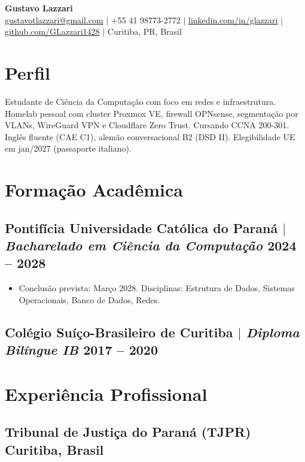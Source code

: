 \documentclass[10.5pt]{article}
\begin{document}
\begin{center}
    {\LARGE\bfseries Gustavo Lazzari} \\
    \vspace{2pt}
    \href{mailto:gustavotlazzari@gmail.com}{gustavotlazzari@gmail.com} $|$
    +55 41 98773-2772 $|$
    \href{https://www.linkedin.com/in/glazzari}{linkedin.com/in/glazzari} $|$
    \href{https://github.com/GLazzari1428}{github.com/GLazzari1428} $|$
    Curitiba, PR, Brasil
\end{center}

\section{Perfil}
Estudante de Ci\^{e}ncia da Computa\c{c}\~{a}o com foco em redes e infraestrutura. Homelab pessoal com
cluster Proxmox VE, firewall OPNsense, segmenta\c{c}\~{a}o por VLANs, WireGuard VPN e Cloudflare Zero Trust.
Cursando CCNA 200-301. Ingl\^{e}s fluente (CAE C1), alem\~{a}o conversacional B2 (DSD II).
Elegibilidade UE em jan/2027 (passaporte italiano).

\section{Forma\c{c}\~{a}o Acad\^{e}mica}
\subsection{Pontif\'{i}cia Universidade Cat\'{o}lica do Paran\'{a} $|$ {\normalfont\itshape Bacharelado em Ci\^{e}ncia da Computa\c{c}\~{a}o} \hfill 2024 -- 2028}
\begin{itemize}
    \item Conclus\~{a}o prevista: Mar\c{c}o 2028. Disciplinas: Estrutura de Dados, Sistemas Operacionais, Banco de Dados, Redes.
\end{itemize}
\subsection{Col\'{e}gio Su\'{i}\c{c}o-Brasileiro de Curitiba $|$ {\normalfont\itshape Diploma Bil\'{i}ngue IB} \hfill 2017 -- 2020}

\section{Experi\^{e}ncia Profissional}
\subsection{Tribunal de Justi\c{c}a do Paran\'{a} (TJPR) \hfill Curitiba, Brasil}
\end{document}
